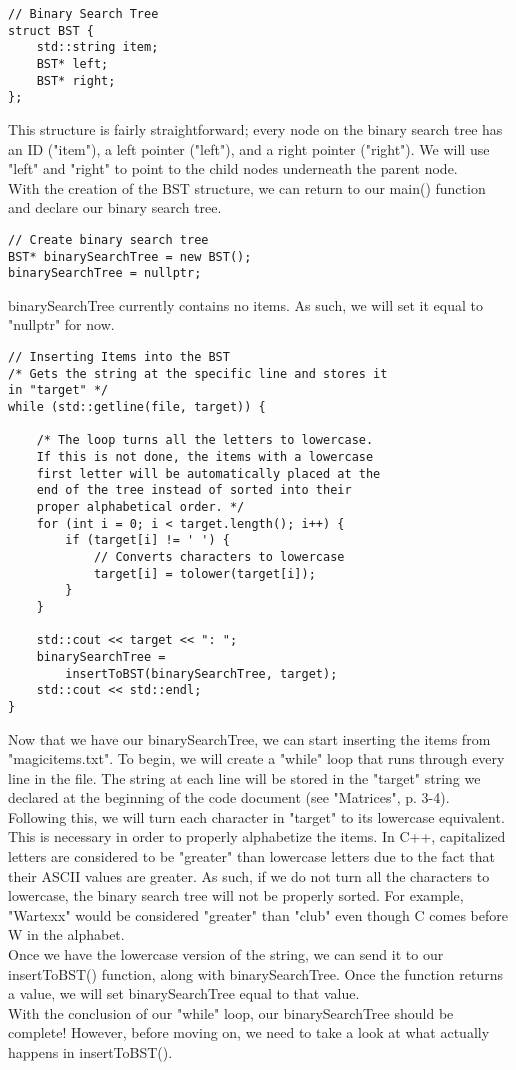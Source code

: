 \documentclass{article}
\begin{document}
\begin{lstlisting}
// Binary Search Tree
struct BST {
    std::string item;
    BST* left;
    BST* right;
};
\end{lstlisting}
\pagebreak
This structure is fairly straightforward; every node on the binary search tree has an ID ("item"), a left pointer ("left"), and a right pointer ("right"). We will use "left" and "right" to point to the child nodes underneath the parent node. \\
With the creation of the BST structure, we can return to our main() function and declare our binary search tree.
\begin{lstlisting}
// Create binary search tree
BST* binarySearchTree = new BST();
binarySearchTree = nullptr;
\end{lstlisting}
binarySearchTree currently contains no items. As such, we will set it equal to "nullptr" for now. 

\begin{lstlisting}
// Inserting Items into the BST
/* Gets the string at the specific line and stores it 
in "target" */
while (std::getline(file, target)) {

    /* The loop turns all the letters to lowercase. 
    If this is not done, the items with a lowercase 
    first letter will be automatically placed at the 
    end of the tree instead of sorted into their 
    proper alphabetical order. */
    for (int i = 0; i < target.length(); i++) {
        if (target[i] != ' ') {
            // Converts characters to lowercase
            target[i] = tolower(target[i]);
        }
    }

    std::cout << target << ": ";
    binarySearchTree = 
        insertToBST(binarySearchTree, target);
    std::cout << std::endl;
}
\end{lstlisting}
Now that we have our binarySearchTree, we can start inserting the items from "magicitems.txt". To begin, we will create a "while" loop that runs through every line in the file. The string at each line will be stored in the "target" string we declared at the beginning of the code document (see "Matrices", p. 3-4). Following this, we will turn each character in "target" to its lowercase equivalent. This is necessary in order to properly alphabetize the items. In C++, capitalized letters are considered to be "greater" than lowercase letters due to the fact that their ASCII values are greater. As such, if we do not turn all the characters to lowercase, the binary search tree will not be properly sorted. For example, "Wartexx" would be considered "greater" than "club" even though C comes before W in the alphabet. \\
Once we have the lowercase version of the string, we can send it to our insertToBST() function, along with binarySearchTree. Once the function returns a value, we will set binarySearchTree equal to that value. \\
With the conclusion of our "while" loop, our binarySearchTree should be complete! However, before moving on, we need to take a look at what actually happens in insertToBST().
\end{document}

